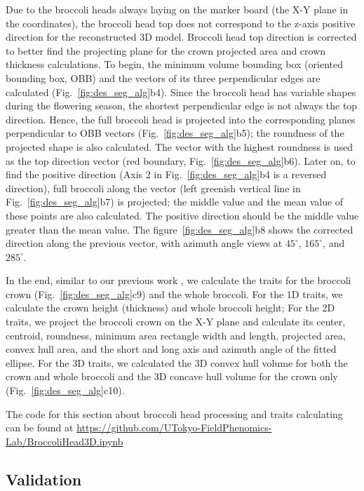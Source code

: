 Due to the broccoli heads always laying on the marker board (the X-Y plane in the coordinates), the broccoli head top does not correspond to the z-axis positive direction for the reconstructed 3D model. Broccoli head top direction is corrected to better find the projecting plane for the crown projected area and crown thickness calculations. To begin, the minimum volume bounding box (oriented bounding box, \acrshort{OBB}) and the vectors of its three perpendicular edges are calculated (Fig.~\ref{fig:des_seg_alg}b4). Since the broccoli head has variable shapes during the flowering season, the shortest perpendicular edge is not always the top direction. Hence, the full broccoli head is projected into the corresponding planes perpendicular to OBB vectors (Fig.~\ref{fig:des_seg_alg}b5); the roundness of the projected shape is also calculated. The vector with the highest roundness is used as the top direction vector (red boundary, Fig.~\ref{fig:des_seg_alg}b6). Later on, to find the positive direction (Axis 2 in Fig.~\ref{fig:des_seg_alg}b4 is a reversed direction), full broccoli along the vector (left greenish vertical line in Fig.~\ref{fig:des_seg_alg}b7) is projected; the middle value and the mean value of these points are also calculated. The positive direction should be the middle value greater than the mean value. The figure~\ref{fig:des_seg_alg}b8 shows the corrected direction along the previous vector, with azimuth angle views at $45^\circ$, $165^\circ$, and $285^\circ$.

In the end, similar to our previous work \citep{feldman_easydcp_2021}, we calculate the traits for the broccoli crown (Fig.~\ref{fig:des_seg_alg}c9) and the whole broccoli. For the 1D traits, we calculate the crown height (thickness) and whole broccoli height; For the 2D traits, we project the broccoli crown on the X-Y plane and calculate its center, centroid, roundness, minimum area rectangle width and length, projected area, convex hull area, and the short and long axis and azimuth angle of the fitted ellipse. For the 3D traits, we calculated the 3D convex hull volume for both the crown and whole broccoli and the 3D concave hull volume for the crown only (Fig.~\ref{fig:des_seg_alg}c10). 

The code for this section about broccoli head processing and traits calculating can be found at \url{https://github.com/UTokyo-FieldPhenomics-Lab/BroccoliHead3D.ipynb}

\subsection{Validation}

